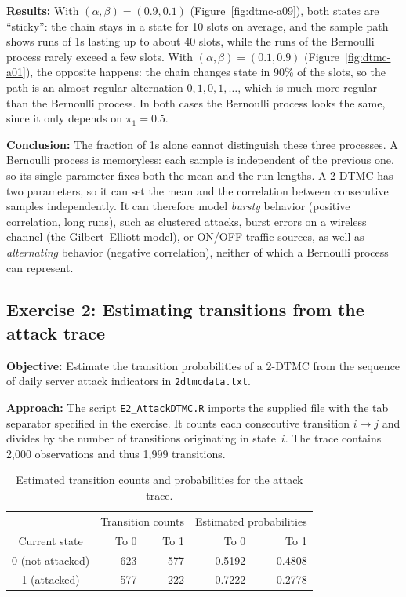 ﻿\documentclass[12pt]{article}
\begin{document}
\textbf{Results:} With $(\alpha,\beta)=(0.9,0.1)$ (Figure~\ref{fig:dtmc-a09}),
both states are ``sticky'': the chain stays in a state for 10 slots on
average, and the sample path shows runs of 1s lasting up to about 40 slots,
while the runs of the Bernoulli process rarely exceed a few slots. With
$(\alpha,\beta)=(0.1,0.9)$ (Figure~\ref{fig:dtmc-a01}), the opposite happens:
the chain changes state in 90\% of the slots, so the path is an almost regular
alternation $0,1,0,1,\dots$, which is much more regular than the
Bernoulli process. In both cases the Bernoulli process looks the same, since it
only depends on $\pi_1=0.5$.

\textbf{Conclusion:} The fraction of 1s alone cannot distinguish these three
processes. A Bernoulli process is memoryless: each sample is independent of the
previous one, so its single parameter fixes both the mean and the run lengths.
A 2-DTMC has two parameters, so it can set the mean and the correlation between
consecutive samples independently. It can therefore model \emph{bursty}
behavior (positive correlation, long runs), such as clustered attacks,
burst errors on a wireless channel (the Gilbert--Elliott model), or ON/OFF
traffic sources, as well as \emph{alternating} behavior (negative correlation),
neither of which a Bernoulli process can represent.

\subsection{Exercise 2: Estimating transitions from the attack trace}

\textbf{Objective:} Estimate the transition probabilities of a 2-DTMC from the sequence of daily server attack indicators in \texttt{2dtmcdata.txt}.

\textbf{Approach:} The script \texttt{E2\_AttackDTMC.R} imports the supplied file with the tab separator specified in the exercise. It counts each consecutive transition $i\to j$ and divides by the number of transitions originating in state~$i$. The trace contains 2,000 observations and thus 1,999 transitions.

\begin{table}[H]
    \centering
    \caption{Estimated transition counts and probabilities for the attack trace.}
    \label{tab:attack-transitions}
    \begin{tabular}{c|rr|rr}
        & \multicolumn{2}{c|}{Transition counts} & \multicolumn{2}{c}{Estimated probabilities} \\
        Current state & To 0 & To 1 & To 0 & To 1 \\
        \hline
        0 (not attacked) & 623 & 577 & 0.5192 & 0.4808 \\
        1 (attacked) & 577 & 222 & 0.7222 & 0.2778 \\
    \end{tabular}
\end{table}
\end{document}
